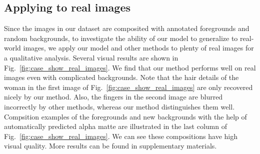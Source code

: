 \begin{comment}
  \texttt{[image: fig/compare\_real\_images/ousuwcnn\_cf\_p\_3c]} & \hspace{-0.3cm}
  \texttt{[image: fig/compare\_real\_images/ousuwcnn\_knn\_p\_3c]} & \hspace{-0.3cm}
  \texttt{[image: fig/compare\_real\_images/ousuwcnn\_img]} & \hspace{-0.3cm}
  \texttt{[image: fig/compare\_real\_images/ousuwcnn\_ifm\_p\_3c]} & \hspace{-0.3cm}
  \texttt{[image: fig/compare\_real\_images/ousuwcnn\_dim5\_p\_3c]} & \hspace{-0.3cm}
  \texttt{[image: fig/compare\_real\_images/ousuwcnn\_e2e]}\\
  Image & PSP50 Regression & PSP50+CF \cite{cho2016natural} & PSP50+KNN \cite{chen2013knn} & PSP50+DCNN \cite{cho2016natural} & PSP50+IFM \cite{aksoy2017designing} & PSP50+DIM \cite{xu2017deep} & Our method\\
\end{tabular}
\end{center}
\caption{\label{fig:case_show_real_images} The visual comparison results on the real images.}
\end{figure*}
\end{comment}







\subsection{Applying to real images}

Since the images in our dataset are composited with annotated foregrounds and random backgrounds, to investigate the ability of our model to generalize to real-world images,
we apply our model and other methods to plenty of real images for a qualitative analysis.
Several visual results are shown in Fig.~\ref{fig:case_show_real_images}.
We find that our method performs well on real images even with complicated backgrounds.
Note that the hair details of the woman in the first image of Fig.~\ref{fig:case_show_real_images} are only recovered nicely by our method.
Also, the fingers in the second image are blurred incorrectly by other methods, whereas our method distinguishes them well.
Compsition examples of the foregrounds and new backgrounds with the help of automatically predicted alpha matte are illustrated in the last column of Fig.~\ref{fig:case_show_real_images}.
We can see these compositions have high visual quality.
More results can be found in supplementary materials.

